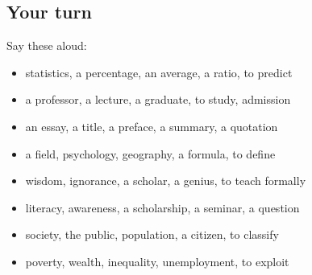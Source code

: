 \subsection*{Your turn}
Say these aloud:

\begin{itemize}
\raggedright
  \item statistics, a percentage, an average, a ratio, to predict
  \item a professor, a lecture, a graduate, to study, admission
  \item an essay, a title, a preface, a summary, a quotation
  \item a field, psychology, geography, a formula, to define
  \item wisdom, ignorance, a scholar, a genius, to teach formally
  \item literacy, awareness, a scholarship, a seminar, a question
  \item society, the public, population, a citizen, to classify
  \item poverty, wealth, inequality, unemployment, to exploit
\end{itemize}

